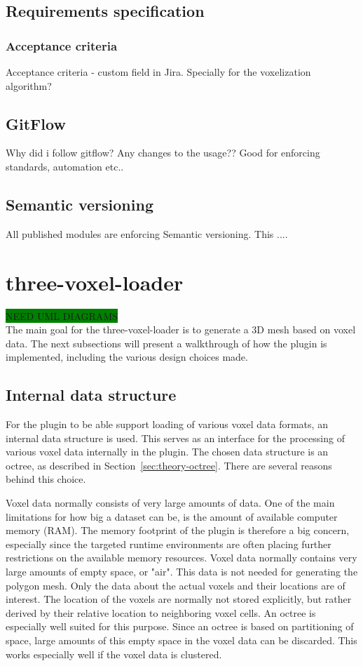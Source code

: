 \subsection{Requirements specification}
\subsubsection{Acceptance criteria}
Acceptance criteria - custom field in Jira.
Specially for the voxelization algorithm?

\subsection{GitFlow}
Why did i follow gitflow? Any changes to the usage?? Good for enforcing standards, automation etc..

\subsection{Semantic versioning}
All published modules are enforcing Semantic versioning. This ....

\section{three-voxel-loader}
\colorbox{green}{NEED UML DIAGRAMS}\\
The main goal for the three-voxel-loader is to generate a 3D mesh based on voxel data. The next subsections will present a walkthrough of how the plugin is implemented, including the various design choices made.

\subsection{Internal data structure}
For the plugin to be able support loading of various voxel data formats, an internal data structure is used. This serves as an interface for the processing of various voxel data internally in the plugin. The chosen data structure is an octree, as described in Section~\ref{sec:theory-octree}. There are several reasons behind this choice. 

Voxel data normally consists of very large amounts of data. One of the main limitations for how big a dataset can be, is the amount of available computer memory (RAM). The memory footprint of the plugin is therefore a big concern, especially since the targeted runtime environments are often placing further restrictions on the available memory resources. Voxel data normally contains very large amounts of empty space, or "air". This data is not needed for generating the polygon mesh. Only the data about the actual voxels and their locations are of interest. The location of the voxels are normally not stored explicitly, but rather derived by their relative location to neighboring voxel cells. An octree is especially well suited for this purpose. Since an octree is based on partitioning of space, large amounts of this empty space in the voxel data can be discarded. This works especially well if the voxel data is clustered.

